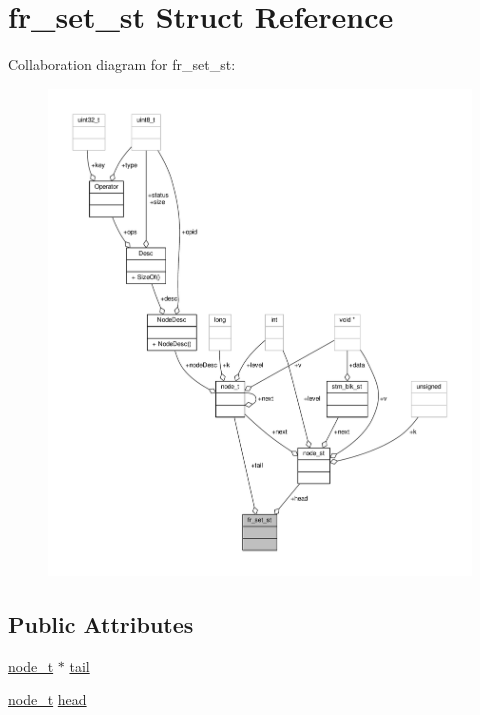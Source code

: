 \hypertarget{structfr__set__st}{\section{fr\-\_\-set\-\_\-st Struct Reference}
\label{structfr__set__st}
}


Collaboration diagram for fr\-\_\-set\-\_\-st\-:
\nopagebreak
\begin{figure}[H]
\begin{center}
\leavevmode
\includegraphics[width=350pt]{structfr__set__st__coll__graph}
\end{center}
\end{figure}
\subsection*{Public Attributes}
\begin{DoxyCompactItemize}
\item 
\hyperlink{structnode__t}{node\-\_\-t} $\ast$ \hyperlink{structfr__set__st_a92e53d1e8353bd352d10d1ce48727218}{tail}
\item 
\hyperlink{structnode__t}{node\-\_\-t} \hyperlink{structfr__set__st_ac8c59d28a8eb6d018995637133eb488a}{head}
\end{DoxyCompactItemize}


